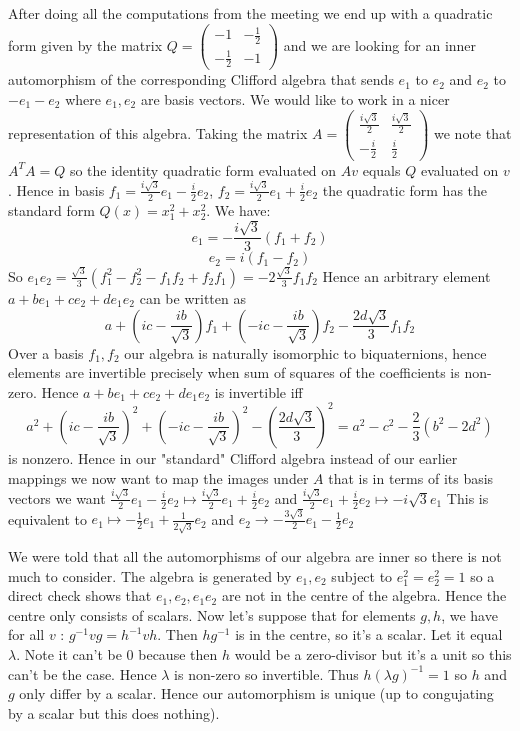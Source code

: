 \documentclass[a4paper]{article}
\begin{document}
After doing all the computations from the meeting we end up with a quadratic form given by the matrix $Q=\begin{pmatrix} -1 & -\frac{1}{2}\\-\frac{1}{2} & -1 \end{pmatrix} $ and we are looking for an inner automorphism of the corresponding Clifford algebra that sends $e_1$ to $e_2$ and $e_2$ to $-e_1-e_2$ where $e_1, e_2$ are basis vectors. We would like to work in a nicer representation of this algebra. 
Taking the matrix $A=\begin{pmatrix} \frac{i\sqrt{3} }{2} & \frac{i\sqrt{3} }{2}\\-\frac{i}{2}&\frac{i}{2} \end{pmatrix} $ we note that $A^{T}A=Q$ so the identity quadratic form evaluated on $Av$ equals $Q$ evaluated on $v$. Hence in basis $f_1 = \frac{i\sqrt{3}}{2}e_1-\frac{i}{2}e_2$, $f_2 = \frac{i\sqrt{3} }{2}e_1+\frac{i}{2}e_2$ the quadratic form has the standard form $Q(x) = x_1^2 +x_2^2$. We have:
$$e_1 = -\frac{i\sqrt{3}}{3}(f_1+f_2)$$
$$e_2 = i(f_1 - f_2)$$
So $e_1e_2 = \frac{\sqrt{3}}{3}(f_1^2-f_2^2-f_1f_2+f_2f_1)= -2\frac{\sqrt{3}}{3}f_1f_2$
Hence an arbitrary element $a + b e_1 + c e_2 + d e_1e_2$ can be written as
$$a+(i c - \frac{i b}{\sqrt{3}}) f_1 +(-i c - \frac{i b}{\sqrt{3}}) f_2 - \frac{2d\sqrt{3}}{3}f_1f_2$$
Over a basis $f_1, f_2$ our algebra is naturally isomorphic to biquaternions, hence elements are invertible precisely when sum of squares of the coefficients is non-zero. Hence $a + b e_1 + c e_2 + d e_1e_2$ is invertible iff 
$$a^2+(i c - \frac{i b}{\sqrt{3}})^2 +(-i c - \frac{i b}{\sqrt{3}})^2 - (\frac{2d\sqrt{3}}{3})^2 = a^2-c^2-\frac{2}{3}(b^2-2d^2)$$ is nonzero.
Hence in our "standard" Clifford algebra instead of our earlier mappings we now want to map the images under $A$ that is in terms of its basis vectors we want $\frac{i\sqrt{3}}{2}e_1-\frac{i}{2}e_2\mapsto \frac{i\sqrt{3} }{2}e_1+\frac{i}{2}e_2$ and $\frac{i\sqrt{3} }{2}e_1+\frac{i}{2}e_2\mapsto -i\sqrt{3}e_1 $
This is equivalent to $e_1\mapsto -\frac{1}{2}e_1+\frac{1}{2\sqrt{3} }e_{2}$ and $e_2\to -\frac{3\sqrt{3} }{2}e_1-\frac{1}{2}e_2$

We were told that all the automorphisms of our algebra are inner so there is not much to consider. The algebra is generated by $e_1,e_2$ subject to $e_1^2=e_2^2=1$ so a direct check shows that $e_1,e_2, e_1e_2$ are not in the centre of the algebra. Hence the centre only consists of scalars.  Now let's suppose that for elements $g,h$, we have for all  $v$ :  $g^{-1}vg=h^{-1}vh$. Then $hg^{-1}$ is in the centre, so it's a scalar. Let it equal $\lambda$. Note it can't be 0 because then  $h$ would be a zero-divisor but it's a unit so this can't be the case. Hence $\lambda$ is non-zero so invertible. Thus $h\left( \lambda g \right) ^{-1}=1$ so $h$ and $g$ only differ by a scalar. Hence our automorphism is unique (up to congujating by a scalar but this does nothing).
\end{document}

